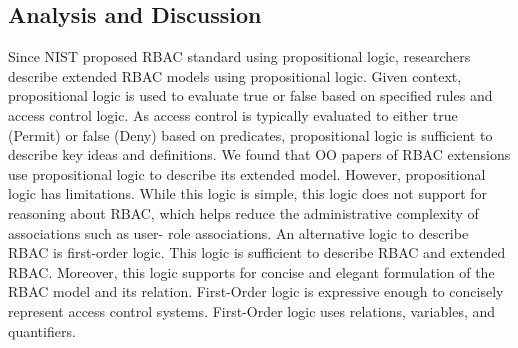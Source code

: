 \subsection{Analysis and Discussion}

Since NIST proposed RBAC standard using propositional logic, researchers describe extended RBAC models using propositional logic. Given context, propositional logic is used to evaluate true or false based on specified rules and access control logic. As access control is typically evaluated to either true (Permit) or false (Deny) based on predicates, propositional logic is sufficient to describe key ideas and definitions. We found that OO papers of RBAC extensions use propositional logic to describe its extended model.
However, propositional logic has limitations. While this logic is simple, this logic does not support for reasoning about RBAC, which helps reduce the administrative complexity of associations such as user- role associations. An alternative logic to describe RBAC is first-order logic. This logic is sufficient to describe RBAC and extended RBAC. Moreover, this logic supports for concise and elegant formulation of the RBAC model and its relation.  First-Order logic is expressive enough to concisely represent access control systems. First-Order logic uses relations, variables, and quantifiers.